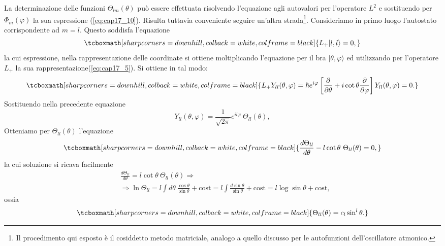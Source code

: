 \documentclass[a4paper,12pt,oneside]{book}
\begin{document}
La determinazione delle funzioni $\Theta _{lm} (\theta)$ può essere effettuata risolvendo l'equazione agli autovalori per l'operatore $L^2$ e sostituendo per $\Phi _m (\varphi)$ la sua espressione (\ref{eq:cap17_10}). Risulta tuttavia conveniente seguire un'altra strada\footnote{Il procedimento qui esposto è il cosiddetto metodo matriciale, analogo a quello discusso per le autofunzioni dell'oscillatore atmonico.}. Consideriamo in primo luogo l'autostato corrispondente ad $m=l$. Questo soddisfa l'equazione
	\begin{equation}
		\tcboxmath[sharp corners=downhill, colback=white, colframe=black]{
			L_+ \vert l,l\rangle =0,
			}
	\end{equation}
la cui espressione, nella rappresentazione delle coordinate si ottiene moltiplicando l'equazione per il bra $\vert \theta, \varphi \rangle$ ed utilizzando per  l'operatore $L_+$ la sua rappresentazione(\ref{eq:cap17_5}). Si ottiene in tal modo:
	\begin{equation}
		\tcboxmath[sharp corners=downhill, colback=white, colframe=black]{
			L_+Y_{ll}(\theta , \varphi ) = \hbar e^{i\varphi}\left[\frac{\partial}{\partial\theta}+i \cot\theta \frac{\partial}{\partial \varphi}\right]Y_{ll}(\theta , \varphi ) =0 .
			}
	\end{equation}
Sostituendo nella precedente equazione 
	\begin{equation}
		Y_{ll}(\theta , \varphi ) = \frac{1}{\sqrt{2\pi}}e^{il\varphi}\ \Theta _{ll} (\theta ) ,
	\end{equation}
Otteniamo per $\Theta _{ll} (\theta )$ l'equazione
	\begin{equation}
		\tcboxmath[sharp corners=downhill, colback=white, colframe=black]{
			\frac{d\Theta _{ll}}{d \theta}-l\cot\theta \ \Theta _{ll} (\theta )=0 ,
			}
	\end{equation}
la cui soluzione si ricava facilmente
	\begin{align}
	& \frac{d\Theta _{ll}}{d \theta}=l\cot\theta \ \Theta _{ll} (\theta ) \Rightarrow \nonumber \\
	& \Rightarrow \ln \Theta _{ll} = l \int d\theta \ \frac{\cos \theta}{\sin \theta}+ \textrm{cost} = l \int  \frac{d\sin \theta}{\sin \theta}+ \textrm{cost} = l \log \sin \theta + \textrm{cost} ,
	\end{align}
ossia
	\begin{equation}
		\tcboxmath[sharp corners=downhill, colback=white, colframe=black]{
			\Theta _{ll} (\theta )= c_l \sin ^l \theta .
			}
	\end{equation}
\end{document}
